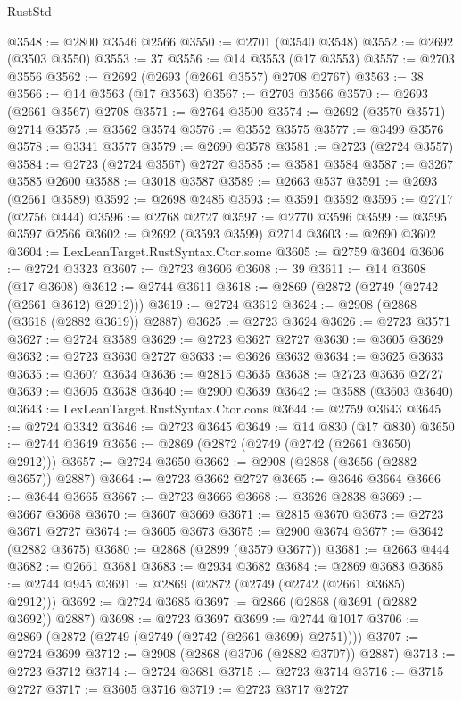 \begin{lexlean}{RustStd}
\begin{coremodule}
@3548 := @2800 @3546 @2566
@3550 := @2701 (@3540 @3548)
@3552 := @2692 (@3503 @3550)
@3553 := 37
@3556 := @14 @3553 (@17 @3553)
@3557 := @2703 @3556
@3562 := @2692 (@2693 (@2661 @3557) @2708 @2767)
@3563 := 38
@3566 := @14 @3563 (@17 @3563)
@3567 := @2703 @3566
@3570 := @2693 (@2661 @3567) @2708
@3571 := @2764 @3500
@3574 := @2692 (@3570 @3571) @2714
@3575 := @3562 @3574
@3576 := @3552 @3575
@3577 := @3499 @3576
@3578 := @3341 @3577
@3579 := @2690 @3578
@3581 := @2723 (@2724 @3557)
@3584 := @2723 (@2724 @3567) @2727
@3585 := @3581 @3584
@3587 := @3267 @3585 @2600
@3588 := @3018 @3587
@3589 := @2663 @537
@3591 := @2693 (@2661 @3589)
@3592 := @2698 @2485
@3593 := @3591 @3592
@3595 := @2717 (@2756 @444)
@3596 := @2768 @2727
@3597 := @2770 @3596
@3599 := @3595 @3597 @2566
@3602 := @2692 (@3593 @3599) @2714
@3603 := @2690 @3602
@3604 := LexLeanTarget.RustSyntax.Ctor.some
@3605 := @2759 @3604
@3606 := @2724 @3323
@3607 := @2723 @3606
@3608 := 39
@3611 := @14 @3608 (@17 @3608)
@3612 := @2744 @3611
@3618 := @2869 (@2872 (@2749 (@2742 (@2661 @3612) @2912)))
@3619 := @2724 @3612
@3624 := @2908 (@2868 (@3618 (@2882 @3619)) @2887)
@3625 := @2723 @3624
@3626 := @2723 @3571
@3627 := @2724 @3589
@3629 := @2723 @3627 @2727
@3630 := @3605 @3629
@3632 := @2723 @3630 @2727
@3633 := @3626 @3632
@3634 := @3625 @3633
@3635 := @3607 @3634
@3636 := @2815 @3635
@3638 := @2723 @3636 @2727
@3639 := @3605 @3638
@3640 := @2900 @3639
@3642 := @3588 (@3603 @3640)
@3643 := LexLeanTarget.RustSyntax.Ctor.cons
@3644 := @2759 @3643
@3645 := @2724 @3342
@3646 := @2723 @3645
@3649 := @14 @830 (@17 @830)
@3650 := @2744 @3649
@3656 := @2869 (@2872 (@2749 (@2742 (@2661 @3650) @2912)))
@3657 := @2724 @3650
@3662 := @2908 (@2868 (@3656 (@2882 @3657)) @2887)
@3664 := @2723 @3662 @2727
@3665 := @3646 @3664
@3666 := @3644 @3665
@3667 := @2723 @3666
@3668 := @3626 @2838
@3669 := @3667 @3668
@3670 := @3607 @3669
@3671 := @2815 @3670
@3673 := @2723 @3671 @2727
@3674 := @3605 @3673
@3675 := @2900 @3674
@3677 := @3642 (@2882 @3675)
@3680 := @2868 (@2899 (@3579 @3677))
@3681 := @2663 @444
@3682 := @2661 @3681
@3683 := @2934 @3682
@3684 := @2869 @3683
@3685 := @2744 @945
@3691 := @2869 (@2872 (@2749 (@2742 (@2661 @3685) @2912)))
@3692 := @2724 @3685
@3697 := @2866 (@2868 (@3691 (@2882 @3692)) @2887)
@3698 := @2723 @3697
@3699 := @2744 @1017
@3706 := @2869 (@2872 (@2749 (@2749 (@2742 (@2661 @3699) @2751))))
@3707 := @2724 @3699
@3712 := @2908 (@2868 (@3706 (@2882 @3707)) @2887)
@3713 := @2723 @3712
@3714 := @2724 @3681
@3715 := @2723 @3714
@3716 := @3715 @2727
@3717 := @3605 @3716
@3719 := @2723 @3717 @2727

\end{coremodule}
\end{lexlean}

